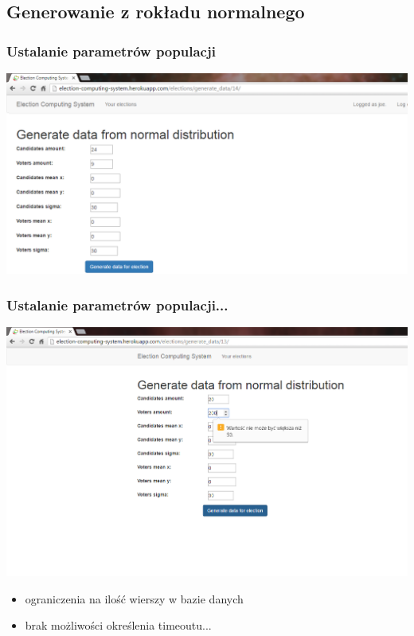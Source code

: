 \documentclass{beamer}
\begin{document}
\subsection{Generowanie z rokładu normalnego}
\begin{frame}
\frametitle{Ustalanie parametrów populacji}
\includegraphics[width=0.8\paperwidth]{screenshots/16_normalny.png}
\end{frame}
\begin{frame}
\frametitle{Ustalanie parametrów populacji...}
\includegraphics[height=0.5\paperheight]{screenshots/17_normalny_limit.png}
\begin{itemize}
\item ograniczenia na ilość wierszy w bazie danych
\item brak możliwości określenia timeoutu...
\end{itemize}
\end{frame}
\end{document}
